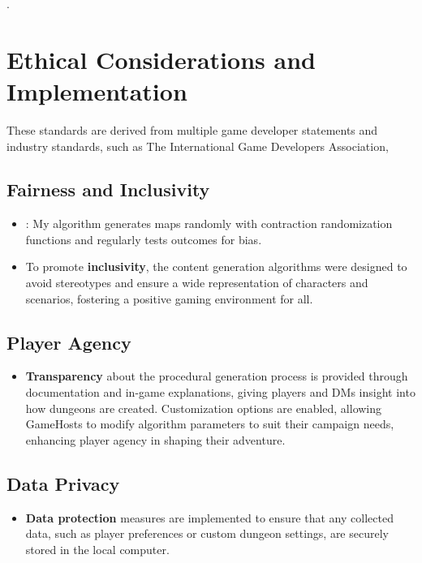 \documentclass[10pt,twocolumn]{article}
\begin{document}
.


\section{Ethical Considerations and Implementation}
These standards are derived from multiple game developer statements and industry standards, such as The International Game Developers Association,

\subsection{Fairness and Inclusivity}
\begin{itemize}
    \item : My algorithm generates maps randomly with contraction randomization functions and regularly tests outcomes for bias.
    \item To promote \textbf{inclusivity}, the content generation algorithms were designed to avoid stereotypes and ensure a wide representation of characters and scenarios, fostering a positive gaming environment for all.\cite{igda2019ethics}
\end{itemize}

\subsection{Player Agency}
\begin{itemize}
    \item \textbf{Transparency} about the procedural generation process is provided through documentation and in-game explanations, giving players and DMs insight into how dungeons are created.   Customization options are enabled, allowing GameHosts to modify algorithm parameters to suit their campaign needs, enhancing player agency in shaping their adventure.\cite{bourke2017morality_ethics_rpg}
\end{itemize}


\subsection{Data Privacy}
\begin{itemize}
    \item \textbf{Data protection} measures are implemented to ensure that any collected data, such as player preferences or custom dungeon settings, are securely stored in the local computer.\cite{igda2019ethics}
\end{itemize}
\end{document}
